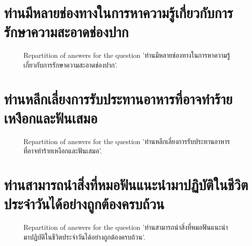 \documentclass[12pt]{article}
\begin{document}
\clearpage{}
\section{ท่านมีหลายช่องทางในการหาความรู้เกี่ยวกับการรักษาความสะอาดช่องปาก}

\label{sec:87}


\begin{figure}[h!]
    \caption{\label{figure:q87-1}Repartition of answers for the question 'ท่านมีหลายช่องทางในการหาความรู้เกี่ยวกับการรักษาความสะอาดช่องปาก'.}
\end{figure}



\clearpage{}
\section{ท่านหลีกเลี่ยงการรับประทานอาหารที่อาจทำร้ายเหงือกและฟันเสมอ}

\label{sec:88}


\begin{figure}[h!]
    \caption{\label{figure:q88-1}Repartition of answers for the question 'ท่านหลีกเลี่ยงการรับประทานอาหารที่อาจทำร้ายเหงือกและฟันเสมอ'.}
\end{figure}



\clearpage{}
\section{ท่านสามารถนำสิ่งที่หมอฟันแนะนำมาปฏิบัติในชีวิตประจำวันได้อย่างถูกต้องครบถ้วน}

\label{sec:89}


\begin{figure}[h!]
    \caption{\label{figure:q89-1}Repartition of answers for the question 'ท่านสามารถนำสิ่งที่หมอฟันแนะนำมาปฏิบัติในชีวิตประจำวันได้อย่างถูกต้องครบถ้วน'.}
\end{figure}
\end{document}
